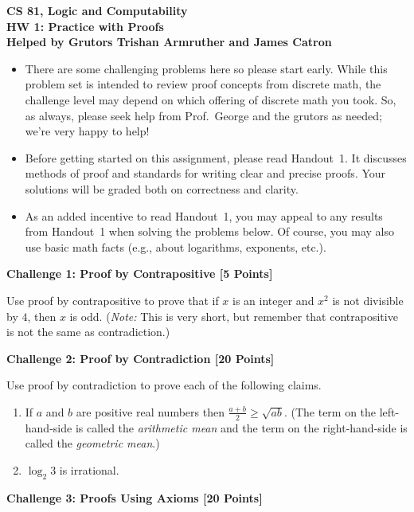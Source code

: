 \documentclass[11pt]{article}
\newcommand{\Problem}[3]{\mbox{} \newline \noindent \textbf{\textbf{Challenge #1: #2 [#3 Points] \\ }}}
\begin{document}
\begin{center}
	\bf
	CS 81, Logic and Computability\\
	HW 1:  Practice with Proofs \\
	Helped by Grutors Trishan Armruther and James Catron
\end{center}

\begin{itemize}
	\item There are some challenging problems here so please start early.  While this problem set is intended to review proof concepts from discrete math, the challenge level may depend on which offering of discrete math you took.  So, as always, please seek help from Prof.\ George and the grutors as needed; we're very happy to help!
	\item Before getting started on this assignment, please read Handout~1.  It discusses methods of proof and standards for writing clear and precise proofs.  Your solutions will be graded both on correctness and clarity.
	\item As an added incentive to read Handout~1, you may appeal to any results from Handout~1 when solving the problems below.  Of course, you may also use basic math facts (e.g., about logarithms, exponents, etc.).
\end{itemize}

\Problem{1}{Proof by Contrapositive}{5}

Use proof by contrapositive to prove that if $x$ is an integer and $x^2$ is not divisible by $4$, then $x$ is odd.  (\emph{Note:}  This is very short, but remember that contrapositive is not the same as contradiction.)

\Problem{2}{Proof by Contradiction}{20}

Use proof by contradiction to prove each of the following claims.
	\begin{enumerate}
		\item If $a$ and $b$ are positive real numbers then $\frac{a+b}{2} \geq \sqrt{ab}$.  (The term on the left-hand-side is called the \emph{arithmetic mean} and the term on the right-hand-side is called the \emph{geometric mean}.)
		\item $\log_2 3$ is irrational.  
	\end{enumerate}

\Problem{3}{Proofs Using Axioms}{20}
\end{document}
